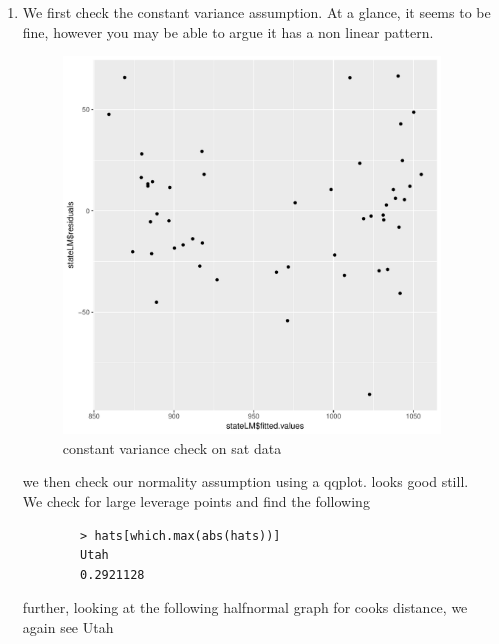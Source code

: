 \documentclass[11pt]{article}
\begin{document}
\begin{enumerate}
	\item
	We first check the constant variance assumption. At a glance, it seems to be fine, however you may be able to argue it has a non linear pattern.
	\begin{figure}[H]
		\centering
		\includegraphics[width=10cm,height=10cm]{satcv.pdf}
		\caption[satcv]{constant variance check on sat data}
		\label{CV check on SAT}
	\end{figure}
	we then check our normality assumption using a qqplot. looks good still.\\
	We check for large leverage points and find the following\\
	\begin{verbatim}
		> hats[which.max(abs(hats))]
		Utah 
		0.2921128 
	\end{verbatim}
	further, looking at the following halfnormal graph for cooks distance, we again see Utah
	\begin{figure}[H]
		\centering

\end{figure}
\end{enumerate}
\end{document}
